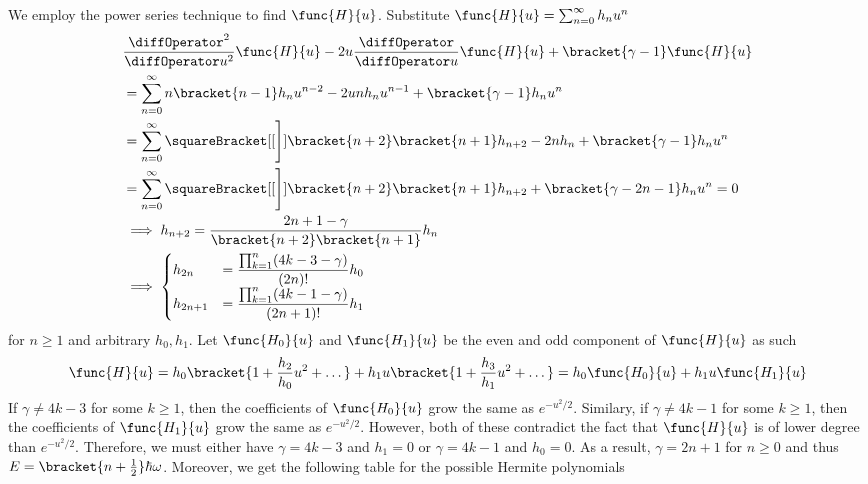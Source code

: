 We employ the power series technique to find \(\func{H}{u}\). Substitute \(\func{H}{u} = \sum_{n = 0}^{\infty} h_n u^n\)
\begin{align*}
     & \frac{\diffOperator^2}{\diffOperator u^2}\func{H}{u} - 2u \frac{\diffOperator}{\diffOperator u}\func{H}{u} + \bracket{\gamma - 1}\func{H}{u} \\
     & = \sum_{n = 0}^{\infty} n \bracket{n-1} h_n u^{n-2} - 2u n h_n u^{n-1} + \bracket{\gamma - 1} h_n u^n                                        \\
     & = \sum_{n = 0}^{\infty} \squareBracket[[\Bigg]]{\bracket{n+2}\bracket{n+1} h_{n+2} - 2 n h_{n} + \bracket{\gamma - 1} h_n}u^n                \\
     & = \sum_{n = 0}^{\infty} \squareBracket[[\Bigg]]{\bracket{n+2}\bracket{n+1} h_{n+2} +  \bracket{\gamma -2 n- 1} h_n}u^n = 0                   \\
     & \implies h_{n+2} = \dfrac{2n + 1 - \gamma}{\bracket{n+2}\bracket{n+1}} h_n                                                                   \\
     & \implies \begin{cases}
                    h_{2n}     & = \dfrac{\prod_{k=1}^n (4k - 3 -\gamma)}{(2n)!} h_0      \\
                    h_{2n + 1} & = \dfrac{\prod_{k=1}^n (4k - 1  -\gamma)}{(2n + 1)!} h_1 \\
                \end{cases}
\end{align*}
for \(n \geq 1\) and arbitrary \(h_0,h_1\). Let \(\func{H_0}{u}\) and \(\func{H_1}{u}\) be the even and odd component of \(\func{H}{u}\) as such
\begin{equation*}
    \func{H}{u} = h_0 \bracket{1 + \frac{h_2}{h_0} u^2 + \dots } + h_1u \bracket{1 + \frac{h_3}{h_1} u^2 + \dots } = h_0 \func{H_0}{u} + h_1u \func{H_1}{u}
\end{equation*}
If \(\gamma \neq 4k - 3\) for some \(k \geq 1\), then the coefficients of \(\func{H_0}{u}\) grow the same as \(e^{-u^2/2}\). Similary, if \(\gamma \neq 4k - 1\) for some \(k \geq 1\), then the coefficients of \(\func{H_1}{u}\) grow the same as \(e^{-u^2/2}\). However, both of these contradict the fact that \(\func{H}{u}\) is of lower degree than \(e^{-u^2/2}\). Therefore, we must either have \(\gamma = 4k - 3\) and \(h_1 = 0\) or \(\gamma = 4k - 1\) and \(h_0 = 0\). As a result, \(\gamma = 2n + 1\) for \(n \geq 0\) and thus \(E = \bracket{n + \frac{1}{2}} \hbar \omega\). Moreover, we get the following table for the possible Hermite polynomials
